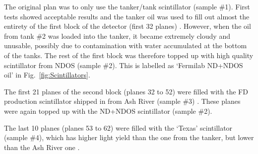 
The original plan \cite{NOvA-doc-34196} was to only use the tanker/tank scintillator (sample \#1). First tests showed acceptable results and the tanker oil was used to fill out almost the entirety of the first block of the detector (first 32 planes) \cite{NOvA-doc-38349}. However, when the oil from tank \#2 was loaded into the tanker, it became extremely cloudy and unusable, possibly due to contamination with water accumulated at the bottom of the tanks. The rest of the first block was therefore topped up with high quality scintillator from \gls{NDOS} (sample \#2). This is labelled as `\gls{Fermilab} \gls{ND}+\gls{NDOS} oil' in Fig.~\ref{fig:Scintillators}.





The first 21 planes of the second block (planes 32 to 52) were filled with the \gls{FD} production scintillator shipped in from Ash River (sample \#3) \cite{NOvA-doc-41961}. These planes were again topped up with the \gls{ND}+\gls{NDOS} scintillator (sample \#2).

The last 10 planes (planes 53 to 62) \cite{NOvA-doc-41961} were filled with the `Texas' scintillator (sample \#4), which has higher light yield than the one from the tanker, but lower than the Ash River one \cite{NOvA-doc-38740}.

